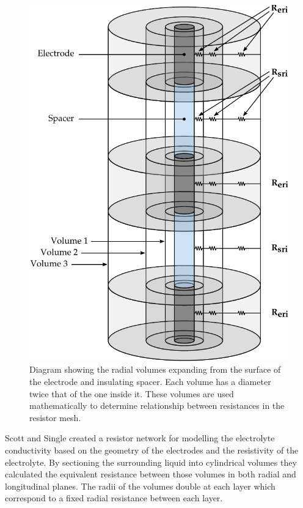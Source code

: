     \begin{figure}
      \centering
      \includegraphics{content/pt2/07-InterfaceModel/graphics/electrodeRings}
      \caption{\label{fig:electrodeRings}Diagram showing the radial volumes expanding from the surface of the electrode and insulating spacer. Each volume has a diameter twice that of the one inside it. These volumes are used mathematically to determine relationship between resistances in the resistor mesh.}
    \end{figure}
    Scott and Single created a resistor network for modelling the electrolyte conductivity based on the geometry of the electrodes and the resistivity of the electrolyte.
    By sectioning the surrounding liquid into cylindrical volumes they calculated the equivalent resistance between those volumes in both radial and longitudinal planes.
    The radii of the volumes double at each layer which correspond to a fixed radial resistance between each layer.
